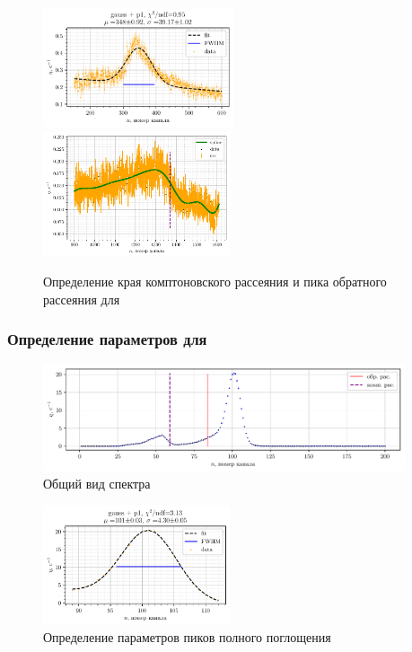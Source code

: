 \begin{figure}[h!]
    \centering
    \includegraphics[width=0.5\textwidth]{figures/co_bp1.pdf}
    \includegraphics[width=0.49\textwidth]{figures/co_comp1.pdf}
    \vspace{-2mm}
    \caption{Определение края комптоновского рассеяния и пика обратного рассеяния для \co}
\end{figure}



\newpage


\subsubsection*{Определение параметров для \am}



\begin{figure}[h!]
    \centering
    \includegraphics[width=0.95\textwidth]{figures/am_0.pdf}
    \caption{Общий вид спектра \am}
\end{figure}



\begin{figure}[h!]
    \centering
    \includegraphics[width=0.49\textwidth]{figures/am_p1.pdf}
    \vspace{-2mm}
    \caption{Определение параметров пиков полного поглощения \co}
\end{figure}



